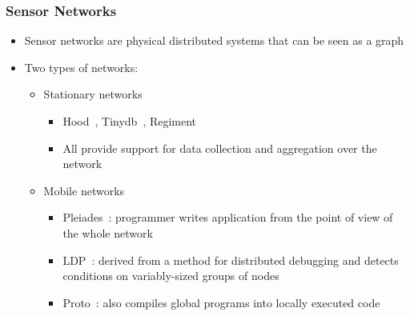 \documentclass{beamer}
\begin{document}
\frame
{
   \frametitle{Sensor Networks}
   \begin{itemize}
      \item Sensor networks are physical distributed systems that can be seen as a graph
      \item Two types of networks:
      \begin{itemize}
         \item Stationary networks
         \begin{itemize}
            \item Hood~\cite{Whitehouse:2004:HNA:990064.990079}, Tinydb~\cite{Madden:2005:TAQ:1061318.1061322}, Regiment~\cite{Newton:2007:RMS:1236360.1236422}
            \item All provide support for data collection and aggregation over the network
         \end{itemize}
         \item Mobile networks
         \begin{itemize}
            \item Pleiades~\cite{Kothari:2007:REP:1250734.1250757}: programmer writes application from the point of view of the whole network
            \item LDP~\cite{4543691}: derived from a method for distributed debugging and detects conditions on variably-sized groups of nodes
            \item Proto~\cite{Beal:2006:IEE:1137236.1137354}: also compiles global programs into locally executed code
         \end{itemize}
      \end{itemize}
   \end{itemize}
}
\end{document}
